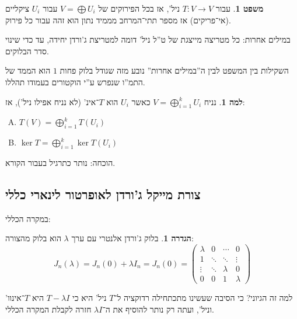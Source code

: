 \documentclass[a4paper]{article}
\newcommand\co        {\colon}
\newcommand\pms[1]    {\begin{pmatrix}
		#1
\end{pmatrix}}
\renewcommand\lg      {\lambda}
\theoremstyle{definition}
\newtheorem{Theorem}{משפט}
\newtheorem{definition}{הגדרה}
\newtheorem{Lemma}{למה}
\newcommand\theo  [1] {\begin{Theorem}#1\end{Theorem}}
\newcommand\defi  [1] {\begin{definition}#1\end{definition}}
\newcommand\lem   [1] {\begin{Lemma}#1\end{Lemma}}
\begin{document}
	\theo{עבור $T \co V \to V$ ניל', אז בכל הפירוקים של $V = \bigoplus U_i$ עבור $U_i$ ציקליים (אי־פריקים) אז מספר תתי־המרחב מממיד נתון הוא זהה עבור כל פירוק. }
	
	במילים אחרות: כל מטריצה מייצגת של ט''ל ניל' דומה למטריצת ג'ורדן יחידה, עד כדי שינוי סדר הבלוקים. 
	
	השקילות בין המשפט לבין ה''במילים אחרות'' נובע מזה שגודל בלוק פחות $1$ הוא הממד של התמ''ו שנפרש ע''י הוקטורים בעמודו תהללו. 
	
	\lem{נניח $V = \bigoplus_{i = 1}^{k} U_i$ כאשר $U_i$ הוא $T$־אינ' (לא נניח אפילו ניל'), אז: 
		\begin{enumerate}[A.]
			\item \hfil $\displaystyle T(V) = \bigoplus_{i = 1}^{k}T(U_i)$
			\item \hfil $\displaystyle \ker T = \bigoplus_{i = 1}^k \ker T(U_i)$
	\end{enumerate}}
	הוכחה: נותר כתרגיל בעבור הקורא. 
	
	\subsection{צורת מייקל ג'ורדן לאופרטור לינארי כללי}
	במקרה הכללי: \defi{בלוק ג'ורדן אלנטרי עם ערך $\lg$ הוא בלוק מהצורה: 
		\[ J_n(\lg) = J_n(0) + \lg I_n = J_n(0) = \pms{\lg & 0 & \cdots & 0 \\ 1 & \ddots & \ddots & \vdots \\ \vdots & \ddots & \lg & 0 \\ 0 & 0 & 1 & \lg} \]
	}
	למה זה הגיוני? כי הסיבה שעשינו מתכתחילה רדוקציה ל־$T$ ניל' היא כי $T - \lg I$ היא $T$־אינוו' וניל', ועתה רק נותר להוסיף את ה־$\lg I$ חזרה לקבלת המקרה הכללי. 
	
\end{document}
